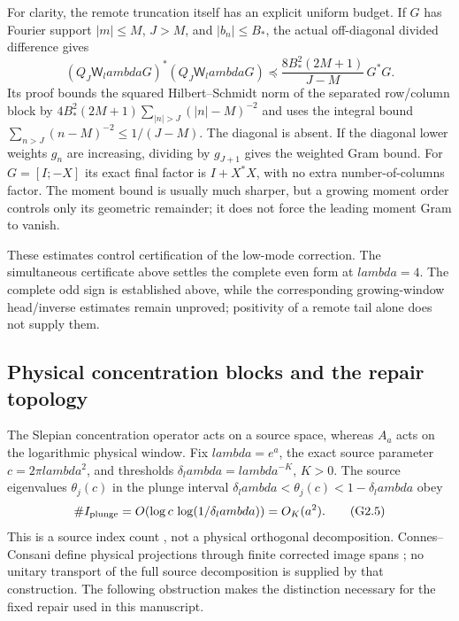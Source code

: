 \documentclass[11pt]{article}
\def\lambda{lambda}%
\theoremstyle{remark}
\begin{document}
For clarity, the remote truncation itself has an explicit uniform
budget. If $G$ has Fourier support $|m|\le M$, $J>M$, and
$|b_n|\le B_*$, the actual off-diagonal divided difference gives
\begin{equation}\label{eq:v120-separated-uniform-budget}
 (Q_J\mathsf W_\lambda G)^*(Q_J\mathsf W_\lambda G)
 \preceq\frac{8B_*^2(2M+1)}{J-M}\,G^*G.
\end{equation}
Its proof bounds the squared Hilbert--Schmidt norm of the separated
row/column block by
$4B_*^2(2M+1)\sum_{|n|>J}(|n|-M)^{-2}$ and uses the
integral bound $\sum_{n>J}(n-M)^{-2}\le1/(J-M)$.
The diagonal is absent. If the diagonal lower weights $g_n$ are increasing,
dividing by $g_{J+1}$ gives the weighted Gram bound. For
$G=[I;-X]$ its exact final factor is $I+X^*X$, with no extra
number-of-columns factor. The moment bound is usually much sharper,
but a growing moment order controls only its geometric remainder;
it does not force the leading moment Gram to vanish.

These estimates control certification of the low-mode correction.
The simultaneous certificate above settles the complete even form at
$\lambda=4$. The complete odd sign is established above, while the corresponding
growing-window head/inverse estimates remain unproved; positivity of a remote tail
alone does not supply them.



\subsection{Physical concentration blocks and the repair topology}
The Slepian concentration operator acts on a source space, whereas
$A_a$ acts on the logarithmic physical window. Fix $\lambda=e^a$,
the exact source parameter $c=2\pi\lambda^2$, and thresholds
$\delta_\lambda=\lambda^{-K}$, $K>0$. The source eigenvalues
$\theta_j(c)$ in the plunge interval
$\delta_\lambda<\theta_j(c)<1-\delta_\lambda$ obey
\[
 \#I_{\rm plunge}
 =O\!\left(\log c\,\log(1/\delta_\lambda)\right)=O_K(a^2).
 \tag{G2.5}
\]
This is a source index count \cite{SlepianTransition}, not a physical
orthogonal decomposition. Connes--Consani define physical projections
through finite corrected image spans \cite{ConnesConsani2023}; no
unitary transport of the full source decomposition is supplied by that
construction. The following obstruction makes the distinction necessary
for the fixed repair used in this manuscript.
\end{document}

